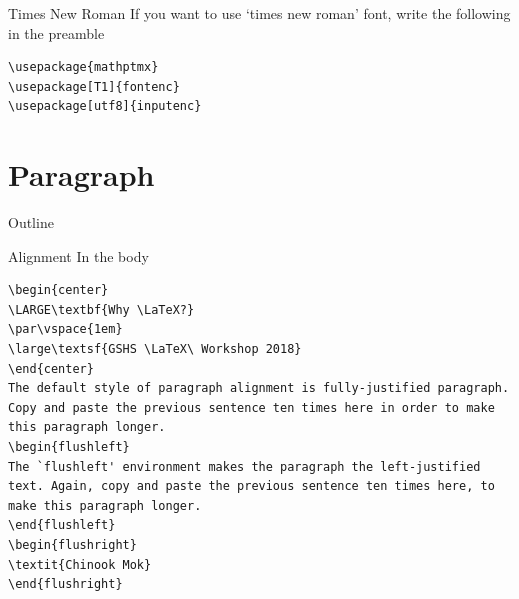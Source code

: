\documentclass[12pt]{gshs_lecture}
\begin{document}
\begin{frame}[t,fragile]{Times New Roman}\small
If you want to use `times new roman' font, write the following in the preamble
\begin{block}{}
\begin{lstlisting}
\usepackage{mathptmx}
\usepackage[T1]{fontenc} 
\usepackage[utf8]{inputenc}
\end{lstlisting}
\end{block}
\end{frame}

\section{Paragraph} %

\begin{frame}[t]{Outline}
\tableofcontents[currentsection]
\end{frame}

\begin{frame}[t,fragile]{Alignment}\small
In the body
\begin{block}{}
\begin{lstlisting}
\begin{center}
\LARGE\textbf{Why \LaTeX?}
\par\vspace{1em}
\large\textsf{GSHS \LaTeX\ Workshop 2018}
\end{center}
The default style of paragraph alignment is fully-justified paragraph. Copy and paste the previous sentence ten times here in order to make this paragraph longer.
\begin{flushleft}
The `flushleft' environment makes the paragraph the left-justified text. Again, copy and paste the previous sentence ten times here, to make this paragraph longer.
\end{flushleft}
\begin{flushright}
\textit{Chinook Mok}
\end{flushright}
\end{lstlisting}
\end{block}
\end{frame}
\end{document}
